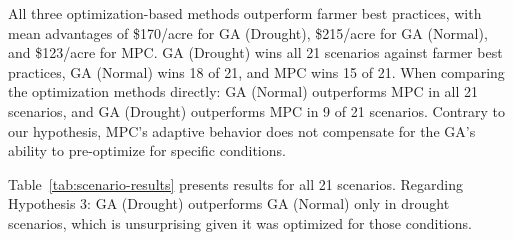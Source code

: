 \documentclass[preprint,12pt]{elsarticle}
\begin{document}
All three optimization-based methods outperform farmer best practices, with mean advantages of \$170/acre for GA (Drought), \$215/acre for GA (Normal), and \$123/acre for MPC. GA (Drought) wins all 21 scenarios against farmer best practices, GA (Normal) wins 18 of 21, and MPC wins 15 of 21. When comparing the optimization methods directly: GA (Normal) outperforms MPC in all 21 scenarios, and GA (Drought) outperforms MPC in 9 of 21 scenarios. Contrary to our hypothesis, MPC's adaptive behavior does not compensate for the GA's ability to pre-optimize for specific conditions.

Table~\ref{tab:scenario-results} presents results for all 21 scenarios. Regarding Hypothesis 3: GA (Drought) outperforms GA (Normal) only in drought scenarios, which is unsurprising given it was optimized for those conditions.

\end{document}
